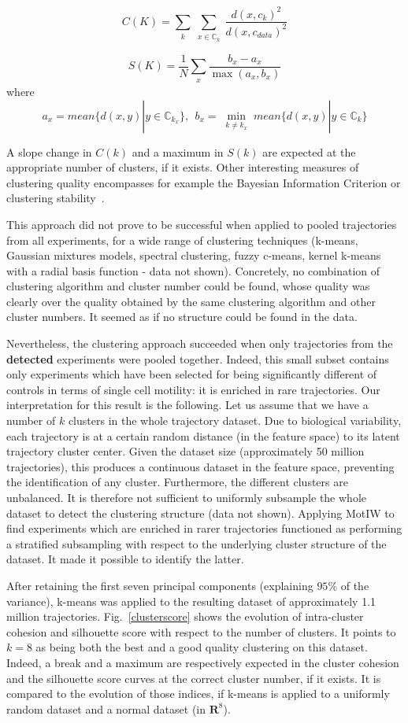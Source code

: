 \[
C(K) = \sum_{\substack{k}} \sum_{\substack{x \in \mathbb{C}_k}} \dfrac{d(x, c_k)^2}{d(x, c_{data})^2}\]

\[
S(K) = \dfrac{1}{N} \sum_{\substack{x}} \dfrac{b_x-a_x}{\max (a_x, b_x)}\]
where \[ a_x = mean \{d(x,y) | y \in \mathbb{C}_{k_x} \},\ \ b_x = \min_{\substack{k\neq k_x}} mean \{d(x,y) | y \in \mathbb{C}_k \}
\]

A slope change in $C(k)$ and a maximum in $S(k)$ are expected at the appropriate number of clusters, if it exists. Other interesting measures of clustering quality encompasses for example the Bayesian Information Criterion or clustering stability~\cite{pmid11928511}.

This approach did not prove to be successful when applied to pooled trajectories from all experiments, for a wide range of clustering techniques (k-means, Gaussian mixtures models, spectral clustering, fuzzy c-means, kernel k-means with a radial basis function - data not shown). Concretely, no combination of clustering algorithm and cluster number could be found, whose quality was clearly over the quality obtained by the same clustering algorithm and other cluster numbers. It seemed as if no structure could be found in the data.

Nevertheless, the clustering approach succeeded when only trajectories from the \textbf{detected} experiments were pooled together. Indeed, this small subset contains only experiments which have been selected for being significantly different of controls in terms of single cell motility: it is enriched in rare trajectories. Our interpretation for this result is the following. Let us assume that we have a number of $k$ clusters in the whole trajectory dataset. Due to biological variability, each trajectory is at a certain random distance (in the feature space) to its latent trajectory cluster center. Given the dataset size (approximately 50 million trajectories), this produces a continuous dataset in the feature space, preventing the identification of any cluster. Furthermore, the different clusters are unbalanced. It is therefore not sufficient to uniformly subsample the whole dataset to detect the clustering structure (data not shown). Applying MotIW to find experiments which are enriched in rarer trajectories functioned as performing a stratified subsampling with respect to the underlying cluster structure of the dataset. It made it possible to identify the latter.

 After retaining the first seven principal components (explaining $95\%$ of the variance), k-means was applied to the resulting dataset of approximately 1.1 million trajectories. Fig.~\ref{clusterscore} shows the evolution of intra-cluster cohesion and silhouette score with respect to the number of clusters. It points to $k=8$ as being both the best and a good quality clustering on this dataset. Indeed, a break and a maximum are respectively expected in the cluster cohesion and the silhouette score curves at the correct cluster number, if it exists. It is compared to the evolution of those indices, if k-means is applied to a uniformly random dataset and a normal dataset (in $\mathbf{R}^8$). 

